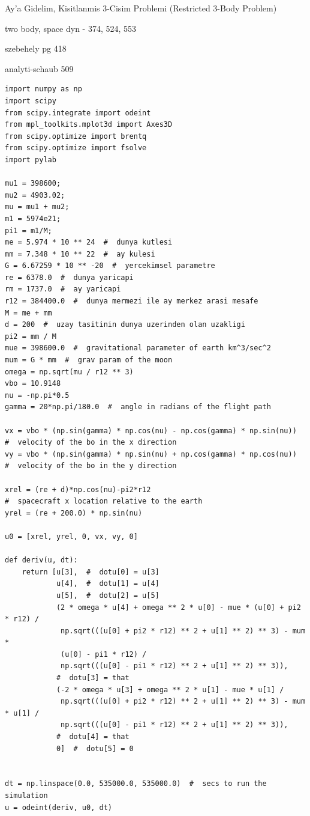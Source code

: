 \documentclass[12pt,fleqn]{article}\usepackage{../../common}
\begin{document}
Ay'a Gidelim, Kisitlanmis 3-Cisim Problemi (Restricted 3-Body Problem)

two body, space dyn - 374, 524, 553

szebehely pg 418

analyti-schaub 509

\begin{verbatim}
import numpy as np
import scipy
from scipy.integrate import odeint
from mpl_toolkits.mplot3d import Axes3D
from scipy.optimize import brentq
from scipy.optimize import fsolve
import pylab

mu1 = 398600;
mu2 = 4903.02;
mu = mu1 + mu2;
m1 = 5974e21;
pi1 = m1/M;
me = 5.974 * 10 ** 24  #  dunya kutlesi
mm = 7.348 * 10 ** 22  #  ay kulesi
G = 6.67259 * 10 ** -20  #  yercekimsel parametre
re = 6378.0  #  dunya yaricapi
rm = 1737.0  #  ay yaricapi
r12 = 384400.0  #  dunya mermezi ile ay merkez arasi mesafe
M = me + mm
d = 200  #  uzay tasitinin dunya uzerinden olan uzakligi
pi2 = mm / M
mue = 398600.0  #  gravitational parameter of earth km^3/sec^2
mum = G * mm  #  grav param of the moon
omega = np.sqrt(mu / r12 ** 3)
vbo = 10.9148
nu = -np.pi*0.5
gamma = 20*np.pi/180.0  #  angle in radians of the flight path

vx = vbo * (np.sin(gamma) * np.cos(nu) - np.cos(gamma) * np.sin(nu))
#  velocity of the bo in the x direction
vy = vbo * (np.sin(gamma) * np.sin(nu) + np.cos(gamma) * np.cos(nu))
#  velocity of the bo in the y direction

xrel = (re + d)*np.cos(nu)-pi2*r12
#  spacecraft x location relative to the earth
yrel = (re + 200.0) * np.sin(nu)

u0 = [xrel, yrel, 0, vx, vy, 0]

def deriv(u, dt):
    return [u[3],  #  dotu[0] = u[3]
            u[4],  #  dotu[1] = u[4]
            u[5],  #  dotu[2] = u[5]
            (2 * omega * u[4] + omega ** 2 * u[0] - mue * (u[0] + pi2 * r12) /
             np.sqrt(((u[0] + pi2 * r12) ** 2 + u[1] ** 2) ** 3) - mum *
             (u[0] - pi1 * r12) /
             np.sqrt(((u[0] - pi1 * r12) ** 2 + u[1] ** 2) ** 3)),
            #  dotu[3] = that
            (-2 * omega * u[3] + omega ** 2 * u[1] - mue * u[1] /
             np.sqrt(((u[0] + pi2 * r12) ** 2 + u[1] ** 2) ** 3) - mum * u[1] /
             np.sqrt(((u[0] - pi1 * r12) ** 2 + u[1] ** 2) ** 3)),
            #  dotu[4] = that
            0]  #  dotu[5] = 0


dt = np.linspace(0.0, 535000.0, 535000.0)  #  secs to run the simulation
u = odeint(deriv, u0, dt)


\end{verbatim}
\end{document}
